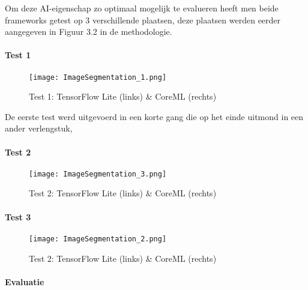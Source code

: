 Om deze AI-eigenschap zo optimaal mogelijk te evalueren heeft men beide frameworks getest op 3 verschillende plaatsen, deze plaatsen werden eerder aangegeven in Figuur 3.2 in de methodologie.

\subsubsection{Test 1}
\begin{figure}[H]
	\centering
	\texttt{[image: ImageSegmentation\_1.png]}
	\caption{Test 1: TensorFlow Lite (links) \& CoreML (rechts)}
\end{figure}

De eerste test werd uitgevoerd in een korte gang die op het einde uitmond in een ander verlengstuk, 

\subsubsection{Test 2}
\begin{figure}[H]
	\centering
	\texttt{[image: ImageSegmentation\_3.png]}
	\caption{Test 2: TensorFlow Lite (links) \& CoreML (rechts)}
\end{figure}

\subsubsection{Test 3}
\begin{figure}[H]
	\centering
	\texttt{[image: ImageSegmentation\_2.png]}
	\caption{Test 2: TensorFlow Lite (links) \& CoreML (rechts)}
\end{figure}


\subsubsection{Evaluatie}

\chapter{}
\label{ch:resultaten}

